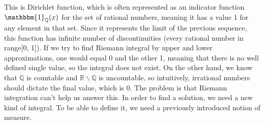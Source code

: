 \documentclass{article}
\begin{document}
This is Dirichlet function, which is often represented as an indicator function $\mathbbm{1}_{\mathbb{Q}}(x)$ for the set of rational numbers, meaning it has a value 1 for any element in that set. Since it represents the limit of the previous sequence, this function has infinite number of discontinuities (every rational number in range[0, 1]). If we try to find Riemann integral by upper and lower approximations, one would equal 0 and the other 1, meaning that there is no well defined single value, so the integral does not exist. On the other hand, we know that $\mathbb{Q}$ is countable and $\mathbb{R}\backslash\mathbb{Q}$ is uncountable, so intuitively, irrational numbers should dictate the final value, which is 0. The problem is that Riemann integration can't help us answer this. In order to find a solution, we need a new kind of integral. To be able to define it, we need a previously introduced notion of measure.
\end{document}
